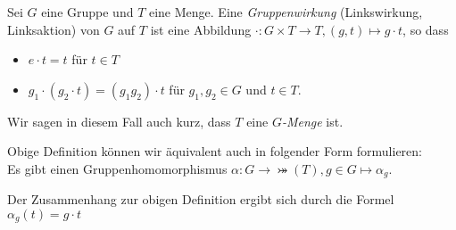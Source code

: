 \begin{definition}
	Sei $G$ eine Gruppe und $T$ eine Menge.
	Eine \emph{Gruppenwirkung} (Linkswirkung, Linksaktion) von $G$ auf $T$ ist eine Abbildung $\cdot: G \times T \to T, (g,t) \mapsto g \cdot t$, so dass
	\begin{itemize}
		\item $e\cdot t = t$ für $t \in T$ 
		\item $g_1 \cdot (g_2 \cdot t) = (g_1 g_2) \cdot t$ für $g_1,g_2 \in G$ und $t \in T$.
	\end{itemize}
	Wir sagen in diesem Fall auch kurz, dass $T$ eine \emph{$G$-Menge} ist.
\end{definition}

\begin{remark}
	Obige Definition können wir äquivalent auch in folgender Form formulieren:\\
	Es gibt einen Gruppenhomomorphismus $\alpha: G \to \bij(T), g \in G \mapsto \alpha_{g}$.

	Der Zusammenhang zur obigen Definition ergibt sich durch die Formel $\alpha_{g}(t) = g \cdot t$
\end{remark}

